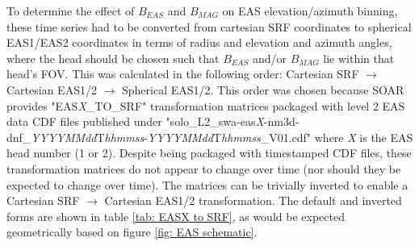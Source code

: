 To determine the effect of \(B_{EAS}\) and \(B_{MAG}\) on EAS elevation/azimuth binning, these time series had to be converted from cartesian SRF coordinates to spherical EAS1/EAS2 coordinates in terms of radius and elevation and azimuth angles, where the head should be chosen such that \(B_{EAS}\) and/or \(B_{MAG}\) lie within that head's FOV. This was calculated in the following order: Cartesian SRF \(\rightarrow\) Cartesian EAS1/2 \(\rightarrow\) Spherical EAS1/2. This order was chosen because SOAR provides "EAS\textit{X}\_TO\_SRF" transformation matrices packaged with level 2 EAS data CDF files published under "solo\_L2\_swa-eas\textit{X}-nm3d-dnf\_\textit{YYYYMMdd}T\textit{hhmmss}-\textit{YYYYMMdd}T\textit{hhmmss}\_V01.cdf" where \textit{X} is the EAS head number (1 or 2). Despite being packaged with timestamped CDF files, these transformation matrices do not appear to change over time (nor should they be expected to change over time). The matrices can be trivially inverted to enable a Cartesian SRF \(\rightarrow\) Cartesian EAS1/2 transformation. The default and inverted forms are shown in table \ref{tab: EASX to SRF}, as would be expected geometrically based on figure \ref{fig: EAS schematic}.
\\

